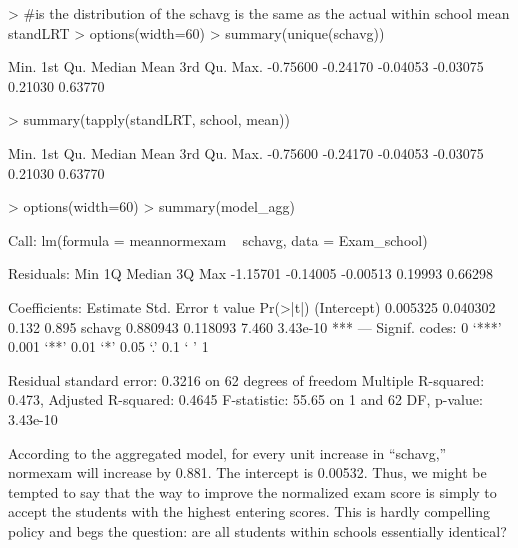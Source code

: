 \documentclass{article}
\begin{document}
\begin{Schunk}
\begin{Sinput}
> #is the distribution of the schavg is the same as the actual within school mean standLRT 
> options(width=60)
> summary(unique(schavg))
\end{Sinput}
\begin{Soutput}
    Min.  1st Qu.   Median     Mean  3rd Qu.     Max. 
-0.75600 -0.24170 -0.04053 -0.03075  0.21030  0.63770 
\end{Soutput}
\begin{Sinput}
> summary(tapply(standLRT, school, mean))
\end{Sinput}
\begin{Soutput}
    Min.  1st Qu.   Median     Mean  3rd Qu.     Max. 
-0.75600 -0.24170 -0.04053 -0.03075  0.21030  0.63770 
\end{Soutput}
\end{Schunk}

\begin{Schunk}
\begin{Sinput}
> options(width=60)
> summary(model_agg)
\end{Sinput}
\begin{Soutput}
Call:
lm(formula = meannormexam ~ schavg, data = Exam_school)

Residuals:
     Min       1Q   Median       3Q      Max 
-1.15701 -0.14005 -0.00513  0.19993  0.66298 

Coefficients:
            Estimate Std. Error t value Pr(>|t|)    
(Intercept) 0.005325   0.040302   0.132    0.895    
schavg      0.880943   0.118093   7.460 3.43e-10 ***
---
Signif. codes:  0 ‘***’ 0.001 ‘**’ 0.01 ‘*’ 0.05 ‘.’ 0.1 ‘ ’ 1 

Residual standard error: 0.3216 on 62 degrees of freedom
Multiple R-squared: 0.473,	Adjusted R-squared: 0.4645 
F-statistic: 55.65 on 1 and 62 DF,  p-value: 3.43e-10 
\end{Soutput}
\end{Schunk}

According to the aggregated model, for every unit increase in ``schavg,'' normexam will increase by 0.881.  The intercept is 0.00532. Thus, we might be tempted to say that the way to improve the normalized exam score is simply to accept the students with the highest entering scores. This is hardly compelling policy and begs the question: are all students within schools essentially identical?  
\end{document}
